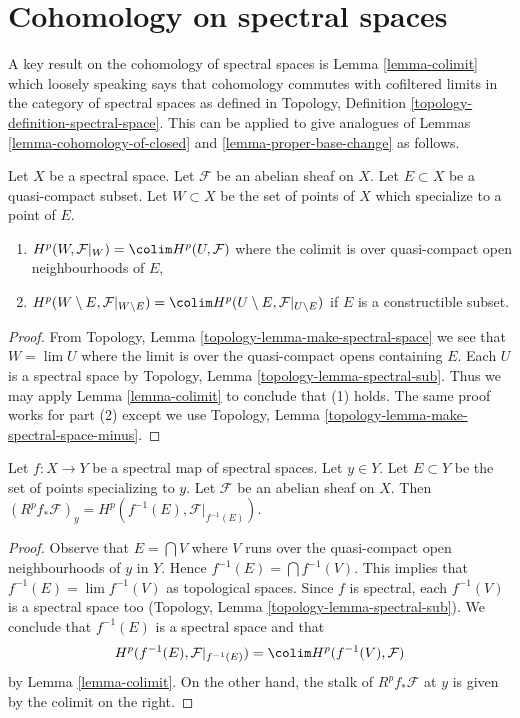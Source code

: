 \section{Cohomology on spectral spaces}
\label{section-spectral}

\noindent
A key result on the cohomology of spectral spaces is Lemma \ref{lemma-colimit}
which loosely speaking says that cohomology commutes with cofiltered limits
in the category of spectral spaces as defined in
Topology, Definition \ref{topology-definition-spectral-space}.
This can be applied to give analogues of
Lemmas \ref{lemma-cohomology-of-closed} and \ref{lemma-proper-base-change}
as follows.

\begin{lemma}
\label{lemma-cohomology-of-neighbourhoods-of-closed}
Let $X$ be a spectral space. Let $\mathcal{F}$ be an abelian sheaf on $X$.
Let $E \subset X$ be a quasi-compact subset. Let $W \subset X$ be the set of
points of $X$ which specialize to a point of $E$.
\begin{enumerate}
\item $H^p(W, \mathcal{F}|_W) = \colim H^p(U, \mathcal{F})$
where the colimit is over quasi-compact open neighbourhoods of $E$,
\item $H^p(W \setminus E, \mathcal{F}|_{W \setminus E}) =
\colim H^p(U \setminus E, \mathcal{F}|_{U \setminus E})$
if $E$ is a constructible subset.
\end{enumerate}
\end{lemma}

\begin{proof}
From Topology, Lemma \ref{topology-lemma-make-spectral-space}
we see that $W = \lim U$ where the limit is over the quasi-compact
opens containing $E$. Each $U$ is a spectral space by
Topology, Lemma \ref{topology-lemma-spectral-sub}.
Thus we may apply Lemma \ref{lemma-colimit} to conclude that (1) holds.
The same proof works for part (2) except we use
Topology, Lemma \ref{topology-lemma-make-spectral-space-minus}.
\end{proof}

\begin{lemma}
\label{lemma-proper-base-change-spectral}
Let $f : X \to Y$ be a spectral map of spectral spaces. Let $y \in Y$.
Let $E \subset Y$ be the set of points specializing to $y$.
Let $\mathcal{F}$ be an abelian sheaf on $X$.
Then $(R^pf_*\mathcal{F})_y = H^p(f^{-1}(E), \mathcal{F}|_{f^{-1}(E)})$.
\end{lemma}

\begin{proof}
Observe that $E = \bigcap V$ where $V$ runs over the quasi-compact
open neighbourhoods of $y$ in $Y$. Hence $f^{-1}(E) = \bigcap f^{-1}(V)$.
This implies that $f^{-1}(E) = \lim f^{-1}(V)$ as topological spaces.
Since $f$ is spectral, each $f^{-1}(V)$ is a spectral space too
(Topology, Lemma \ref{topology-lemma-spectral-sub}).
We conclude that $f^{-1}(E)$ is a spectral space and that
$$
H^p(f^{-1}(E), \mathcal{F}|_{f^{-1}(E)}) =
\colim H^p(f^{-1}(V), \mathcal{F})
$$
by Lemma \ref{lemma-colimit}. On the other hand, the stalk of
$R^pf_*\mathcal{F}$ at $y$ is given by the colimit on the right.
\end{proof}

